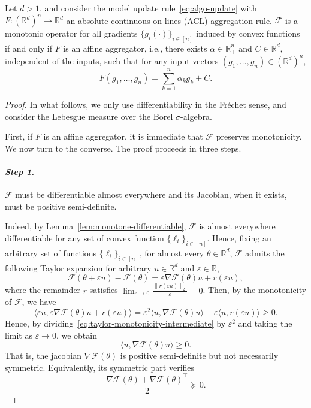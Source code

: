 \documentclass[twoside,11pt]{article}
\newcommand\mb{\mathbb}
\newcommand{\R}{\mathbb{R}}
\newcommand{\F}{\mathcal{F}}
\begin{document}
\begin{theorem}\label{thm:universal_convexity-acl}
    Let $d>1$, and consider the model update rule~\eqref{eq:algo-update} with $F: (\R^d)^n \to \R^d$ an absolute continuous on lines (ACL) aggregation rule.  
    $\F$ is a monotonic operator for all gradients $\{g_i(\cdot)\}_{i\in[n]}$ induced by convex functions
    if and only if $F$ is an affine aggregator, i.e., there exists $\alpha \in \mb{R}_+^n$ and $C \in \mb{R}^d$, independent of the inputs, such that for any input vectors $(g_1, \ldots, g_n) \in (\mb{R}^d)^n$,
    \[
        F(g_1, \ldots, g_n) = \sum_{k=1}^n \alpha_k g_k + C.
    \]
\end{theorem}
\begin{proof}
    In what follows, we only use differentiability in the Fréchet sense, and consider the Lebesgue measure over the Borel $\sigma$-algebra.
 
    First, if $F$ is an affine aggregator, it is immediate that $\F$ preserves monotonicity.
    We now turn to the converse. The proof proceeds in three steps.
    
    \paragraph{\textit{\textbf{Step 1.}}}
    $\F$ must be differentiable almost everywhere and its Jacobian, when it exists, must be positive semi-definite.

    Indeed, by Lemma~\ref{lem:monotone-differentiable}, $\F$ is almost everywhere differentiable for any set of convex function $\{\ell_i\}_{i\in[n]}$.
    Hence, fixing an arbitrary set of functions $\{\ell_i\}_{i\in[n]}$, for almost every $\theta \in \R^d$, $\F$ admits the following Taylor expansion for arbitrary $u \in \R^d$ and $\varepsilon \in \R$,
    \[
      \F(\theta + \varepsilon u) - \F(\theta) = \varepsilon \nabla\F(\theta)u + r(\varepsilon u),
    \]
    where the remainder $r$ satisfies $\lim_{\varepsilon \to 0} \frac{\|r(\varepsilon u)\|_2}{\varepsilon} = 0$. 
    Then, by the monotonicity of $\F$, we have
    \begin{equation}\label{eq:taylor-monotonicity-intermediate}
      \langle \varepsilon u , \varepsilon \nabla\F(\theta)u + r(\varepsilon u) \rangle 
      = \varepsilon^2 \langle u , \nabla\F(\theta)u \rangle + \varepsilon \langle u, r(\varepsilon u) \rangle 
      \geq 0.
    \end{equation}
    Hence, by dividing~\eqref{eq:taylor-monotonicity-intermediate} by $\varepsilon^2$ and taking the limit as $\varepsilon \to 0$, we obtain
    \begin{equation*}
      \langle u , \nabla\F(\theta)u \rangle \geq 0.
    \end{equation*}
    That is, the jacobian $\nabla\F(\theta)$ is positive semi-definite but not necessarily symmetric.
    Equivalently, its symmetric part verifies
    \begin{equation}\label{eq:psdjacobianoperator}
      \frac{\nabla\F(\theta) + \nabla\F(\theta)^\intercal}{2} \succeq 0.
    \end{equation}
    

\end{proof}
\end{document}
